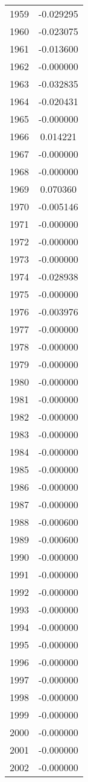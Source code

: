 \documentclass[12pt]{article}
\begin{document}
\begin{longtable}{@{}cc@{}}
1959 & -0.029295 \\
1960 & -0.023075 \\
1961 & -0.013600 \\
1962 & -0.000000 \\
1963 & -0.032835 \\
1964 & -0.020431 \\
1965 & -0.000000 \\
1966 & 0.014221 \\
1967 & -0.000000 \\
1968 & -0.000000 \\
1969 & 0.070360 \\
1970 & -0.005146 \\
1971 & -0.000000 \\
1972 & -0.000000 \\
1973 & -0.000000 \\
1974 & -0.028938 \\
1975 & -0.000000 \\
1976 & -0.003976 \\
1977 & -0.000000 \\
1978 & -0.000000 \\
1979 & -0.000000 \\
1980 & -0.000000 \\
1981 & -0.000000 \\
1982 & -0.000000 \\
1983 & -0.000000 \\
1984 & -0.000000 \\
1985 & -0.000000 \\
1986 & -0.000000 \\
1987 & -0.000000 \\
1988 & -0.000600 \\
1989 & -0.000600 \\
1990 & -0.000000 \\
1991 & -0.000000 \\
1992 & -0.000000 \\
1993 & -0.000000 \\
1994 & -0.000000 \\
1995 & -0.000000 \\
1996 & -0.000000 \\
1997 & -0.000000 \\
1998 & -0.000000 \\
1999 & -0.000000 \\
2000 & -0.000000 \\
2001 & -0.000000 \\
2002 & -0.000000 \\

\end{longtable}
\end{document}
